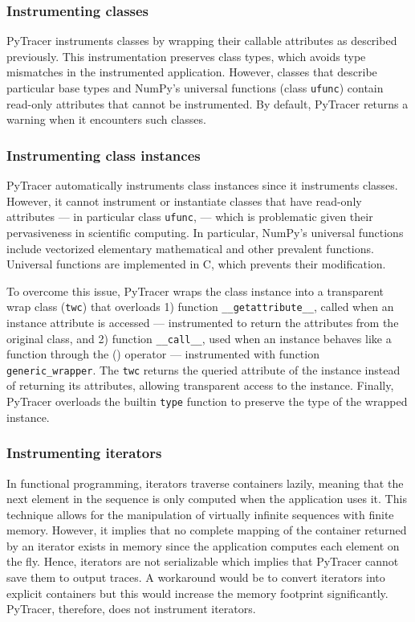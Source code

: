 \documentclass[10pt,journal,compsoc]{IEEEtran}
\newcommand{\pytracer}[0]{PyTracer\xspace}
\begin{document}
\subsubsection{Instrumenting classes}

\pytracer instruments classes by wrapping their callable attributes as described
previously. This instrumentation preserves class types, which avoids type
mismatches in the instrumented application. However, classes that describe
particular base types and NumPy's universal functions (class \texttt{ufunc})
contain read-only attributes that cannot be instrumented. By default, \pytracer
returns a warning when it encounters such classes. 

\subsubsection{Instrumenting class instances}

\pytracer automatically instruments class instances since it instruments
classes. However, it cannot instrument or instantiate classes that have
read-only attributes --- in particular class \texttt{ufunc}, --- which is
problematic given their pervasiveness in scientific computing. In particular,
NumPy's universal functions include vectorized elementary mathematical and other
prevalent functions. Universal functions are implemented in C, which prevents
their modification.

To overcome this issue, \pytracer wraps the class instance into a transparent
wrap class (\texttt{twc}) that overloads 1) function
\texttt{\_\_getattribute\_\_}, called when an instance attribute is accessed ---
instrumented to return the attributes from the original class, and 2) function
\texttt{\_\_call\_\_}, used when an instance behaves like a function through the
() operator --- instrumented with function \texttt{generic\_wrapper}. The
\texttt{twc} returns the queried attribute of the instance instead of returning
its attributes, allowing transparent access to the instance.  Finally, \pytracer
overloads the builtin \texttt{type} function to preserve the type of the wrapped
instance.

\subsubsection{Instrumenting iterators}

In functional programming, iterators traverse containers lazily, meaning that
the next element in the sequence is only computed when the application uses it.
This technique allows for the manipulation of virtually infinite sequences with
finite memory. However, it implies that no complete mapping of the container
returned by an iterator exists in memory since the application computes each
element on the fly. Hence, iterators are not serializable which implies that
\pytracer cannot save them to output traces. A workaround would be to convert
iterators into explicit containers but this would increase the memory
footprint significantly. \pytracer, therefore, does not instrument
iterators.
\end{document}
